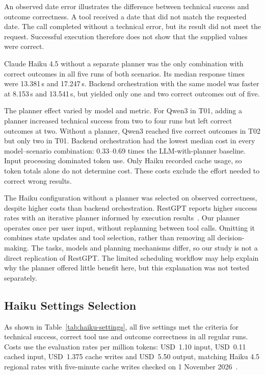 An observed date error illustrates the difference between technical success and outcome correctness.
A tool received a date that did not match the requested date.
The call completed without a technical error, but its result did not meet the request.
Successful execution therefore does not show that the supplied values were correct.

Claude Haiku 4.5 without a separate planner was the only combination with correct outcomes in all five runs of both scenarios.
Its median response times were 13.381\,s and 17.247\,s.
Backend orchestration with the same model was faster at 8.153\,s and 13.541\,s, but yielded only one and two correct outcomes out of five.

The planner effect varied by model and metric.
For Qwen3 in T01, adding a planner increased technical success from two to four runs but left correct outcomes at two.
Without a planner, Qwen3 reached five correct outcomes in T02 but only two in T01.
Backend orchestration had the lowest median cost in every model--scenario combination: 0.33--0.69 times the LLM-with-planner baseline.
Input processing dominated token use.
Only Haiku recorded cache usage, so token totals alone do not determine cost.
These costs exclude the effort needed to correct wrong results.

The Haiku configuration without a planner was selected on observed correctness, despite higher costs than backend orchestration.
RestGPT reports higher success rates with an iterative planner informed by execution results~\cite{song2023restgpt}.
Our planner operates once per user input, without replanning between tool calls.
Omitting it combines state updates and tool selection, rather than removing all decision-making.
The tasks, models and planning mechanisms differ, so our study is not a direct replication of RestGPT.
The limited scheduling workflow may help explain why the planner offered little benefit here, but this explanation was not tested separately.

\subsection{Haiku Settings Selection}\label{sec:selected-evaluation}
As shown in Table~\ref{tab:haiku-settings}, all five settings met the criteria for technical success, correct tool use and outcome correctness in all regular runs.
Costs use the evaluation rates per million tokens: USD~1.10 input, USD~0.11 cached input, USD~1.375 cache writes and USD~5.50 output, matching Haiku 4.5 regional rates with five-minute cache writes checked on 1 November 2026~\cite{Anthropic2026Pricing}.


